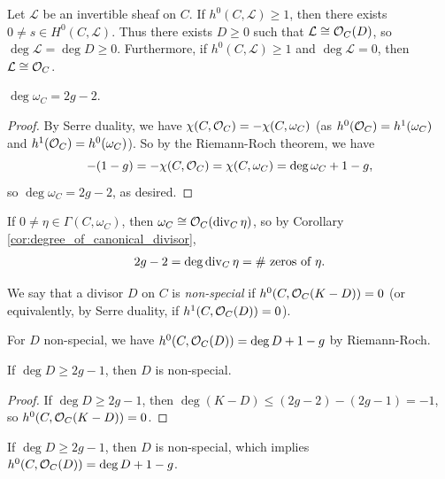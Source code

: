 \begin{example}
  Let $\mathcal{L}$ be an invertible sheaf
  on $C$. If $h^0(C, \mathcal{L}) \ge 1$,
  then there exists $0 \ne s \in H^0(C, \mathcal{L})$.
  Thus there exists $D \ge 0$ such that
  $\mathcal{L} \cong \mathcal{O}_C(D)$, so
  $\deg \mathcal{L} = \deg D \ge 0$.
  Furthermore, if $h^0(C, \mathcal{L}) \ge 1$
  and $\deg \mathcal{L} = 0$, then
  $\mathcal{L} \cong \mathcal{O}_C$.
\end{example}

\begin{corollary}\label{cor:degree_of_canonical_divisor}
  $\deg \omega_C = 2 g - 2$.
\end{corollary}

\begin{proof}
  By Serre duality, we have
  $\chi(C, \mathcal{O}_C) = -\chi(C, \omega_C)$
  (as $h^0(\mathcal{O}_C) = h^1(\omega_C)$ and
  $h^1(\mathcal{O}_C) = h^0(\omega_C)$). So by
  the Riemann-Roch theorem, we have
  \[
    -(1 - g)
    = -\chi(C, \mathcal{O}_C)
    = \chi(C, \omega_C)
    = \deg \omega_C + 1 - g,
  \]
  so $\deg \omega_C = 2g - 2$, as desired.
\end{proof}

\begin{remark}
  If $0 \ne \eta \in \Gamma(C, \omega_C)$, then
  $\omega_C \cong \mathcal{O}_C(\operatorname{div}_C \eta)$, so
  by Corollary \ref{cor:degree_of_canonical_divisor},
  \[
    2g - 2
    = \deg \operatorname{div}_C \eta = \text{\# zeros of $\eta$}.
  \]
\end{remark}

\begin{definition}
  We say that a
  divisor $D$ on $C$ is \emph{non-special} if
  $h^0(C, \mathcal{O}_C(K - D)) = 0$
  (or equivalently, by Serre duality, if
  $h^1(C, \mathcal{O}_C(D)) = 0$).
\end{definition}

\begin{remark}
  For $D$ non-special, we have
  $h^0(C, \mathcal{O}_C(D)) = \deg D + 1 - g$ by
  Riemann-Roch.
\end{remark}

\begin{lemma}
  If $\deg D \ge 2g - 1$, then
  $D$ is non-special.
\end{lemma}

\begin{proof}
  If $\deg D \ge 2g - 1$, then
  $\deg(K - D) \le (2g - 2) - (2g - 1) = -1$,
  so $h^0(C, \mathcal{O}_C(K - D)) = 0$.
\end{proof}

\begin{remark}
  If $\deg D \ge 2g - 1$, then
  $D$ is non-special, which implies
  $h^0(C, \mathcal{O}_C(D)) = \deg D + 1 - g$.
\end{remark}

